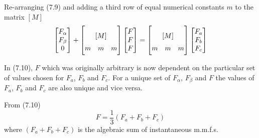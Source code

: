 \documentclass[a4paper,numbers=noenddot,12pt]{scrbook}
\begin{document}
        Re-arranging (7.9) and adding a third row of equal numerical constants $m$ to the matrix $[M]$
        \begin{equation}
            \begin{bmatrix}
                F_{\alpha} \\ F_{\beta} \\ 0
            \end{bmatrix}
            +
            \begin{bmatrix}
                [M] \vphantom
                {\begin{matrix}
                    F \\ F
                \end{matrix}} \\
                \begin{matrix}
                    m & m & m
                \end{matrix}
            \end{bmatrix}
            \begin{bmatrix}
                F \\ F \\ F
            \end{bmatrix}
            =
            \begin{bmatrix}
                [M] \vphantom
                {\begin{matrix}
                    F \\ F
                \end{matrix}} \\
                \begin{matrix}
                    m & m & m
                \end{matrix}
            \end{bmatrix}
            \begin{bmatrix}
                F_a \\ F_b \\ F_c
            \end{bmatrix}
            \label{eq:Eq7.10}
        \end{equation}

        In (7.10), $F$ which was originally arbitrary is now dependent on the particular set of values chosen for $F_a$, $F_b$ and $F_c$. For a unique set of $F_{\alpha}$, $F_{\beta}$ and $F$ the values of $F_a$, $F_b$ and $F_c$ are also unique and vice versa.

        From (7.10)
        \begin{equation}
            F = \dfrac{1}{3}(F_a + F_b + F_c)
            \label{eq:Eq7.11}
        \end{equation}
        where $(F_a + F_b + F_c)$ is the algebraic sum of instantaneous m.m.f.s.
\end{document}
